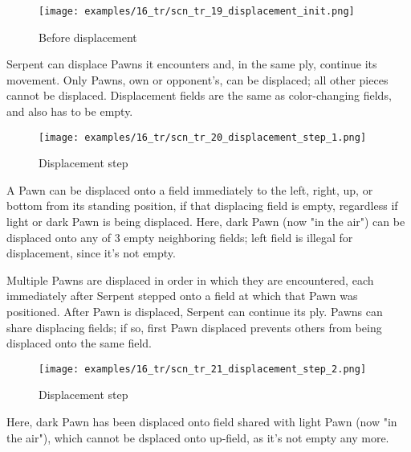 \noindent
\begin{wrapfigure}[9]{l}{0.4\textwidth}
\centering
\texttt{[image: examples/16\_tr/scn\_tr\_19\_displacement\_init.png]}
\vspace*{-0.5\baselineskip}
\caption{Before displacement}
\label{fig:scn_tr_19_displacement_init}
\end{wrapfigure}
Serpent can displace Pawns it encounters and, in the same ply, continue its movement.
Only Pawns, own or opponent's, can be displaced; all other pieces cannot be displaced. \newline
\indent
Displacement fields are the same as color-changing fields, and also has to be empty.

\vspace*{1.3\baselineskip}
\noindent
\begin{wrapfigure}[11]{l}{0.4\textwidth}
\centering
\texttt{[image: examples/16\_tr/scn\_tr\_20\_displacement\_step\_1.png]}
\vspace*{-0.5\baselineskip}
\caption{Displacement step}
\label{fig:scn_tr_20_displacement_step_1}
\end{wrapfigure}
A Pawn can be displaced onto a field immediately to the left, right, up, or bottom
from its standing position, if that displacing field is empty, regardless if light
or dark Pawn is being displaced. \newline
\indent
Here, dark Pawn (now "in the air") can be displaced onto any of 3 empty neighboring
fields; left field is illegal for displacement, since it's not empty.

\vspace*{-0.8\baselineskip}
\mbox{} \newline %
Multiple Pawns are displaced in order in which they are encountered, each immediately
after Serpent stepped onto a field at which that Pawn was positioned. After Pawn is
displaced, Serpent can continue its ply. Pawns can share displacing fields; if so,
first Pawn displaced prevents others from being displaced onto the same field.

\clearpage %

\noindent
\begin{wrapfigure}[5]{l}{0.4\textwidth}
\centering
\texttt{[image: examples/16\_tr/scn\_tr\_21\_displacement\_step\_2.png]}
\vspace*{-0.5\baselineskip}
\caption{Displacement step}
\label{fig:scn_tr_21_displacement_step_2}
\end{wrapfigure}
Here, dark Pawn has been displaced onto field shared with light Pawn (now "in the air"),
which cannot be dsplaced onto up-field, as it's not empty any more.

